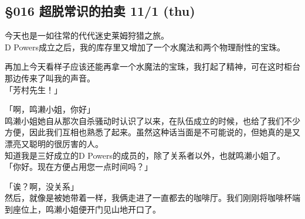 \subsection{§016 超脱常识的拍卖 11/1 (thu)}

今天也是一如往常的代代迷史莱姆狩猎之旅。\\

D Powers成立之后，我的库存里又增加了一个水魔法和两个物理耐性的宝珠。

再加上今天看样子应该还能再拿一个水魔法的宝珠，我打起了精神，可在这时柜台那边传来了叫我的声音。\\

「芳村先生！」

「啊，鸣濑小姐，你好」\\

鸣濑小姐她自从那次自杀骚动时认识了以来，在队伍成立的时候，也给了我们不少方便，因此我们互相也熟悉了起来。虽然这种话当面是不可能说的，但她真的是又漂亮又聪明的很厉害的人。\\

知道我是三好成立的D Powers的成员的，除了关系者以外，也就鸣濑小姐了。\\

「你好。现在方便占用您一点时间吗？」

「诶？啊，没关系」\\

然后，就像是被她带着一样，我俩走进了一直都去的咖啡厅。我们刚刚将咖啡杯端到座位上，鸣濑小姐便开门见山地开口了。\\

